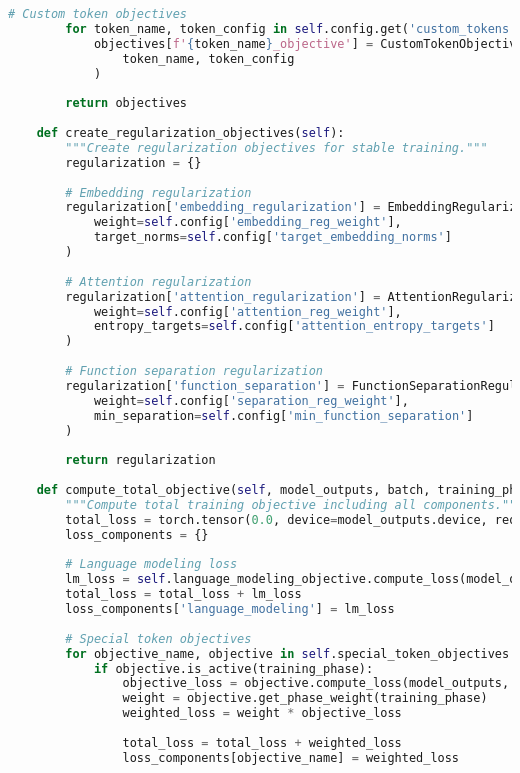 \begin{lstlisting}[language=Python, caption=Progressive curriculum framework for special token pretraining]
        # Custom token objectives
        for token_name, token_config in self.config.get('custom_tokens', {}).items():
            objectives[f'{token_name}_objective'] = CustomTokenObjective(
                token_name, token_config
            )
        
        return objectives
    
    def create_regularization_objectives(self):
        """Create regularization objectives for stable training."""
        regularization = {}
        
        # Embedding regularization
        regularization['embedding_regularization'] = EmbeddingRegularization(
            weight=self.config['embedding_reg_weight'],
            target_norms=self.config['target_embedding_norms']
        )
        
        # Attention regularization
        regularization['attention_regularization'] = AttentionRegularization(
            weight=self.config['attention_reg_weight'],
            entropy_targets=self.config['attention_entropy_targets']
        )
        
        # Function separation regularization
        regularization['function_separation'] = FunctionSeparationRegularization(
            weight=self.config['separation_reg_weight'],
            min_separation=self.config['min_function_separation']
        )
        
        return regularization
    
    def compute_total_objective(self, model_outputs, batch, training_phase):
        """Compute total training objective including all components."""
        total_loss = torch.tensor(0.0, device=model_outputs.device, requires_grad=True)
        loss_components = {}
        
        # Language modeling loss
        lm_loss = self.language_modeling_objective.compute_loss(model_outputs, batch)
        total_loss = total_loss + lm_loss
        loss_components['language_modeling'] = lm_loss
        
        # Special token objectives
        for objective_name, objective in self.special_token_objectives.items():
            if objective.is_active(training_phase):
                objective_loss = objective.compute_loss(model_outputs, batch)
                weight = objective.get_phase_weight(training_phase)
                weighted_loss = weight * objective_loss
                
                total_loss = total_loss + weighted_loss
                loss_components[objective_name] = weighted_loss
        

\end{lstlisting}
